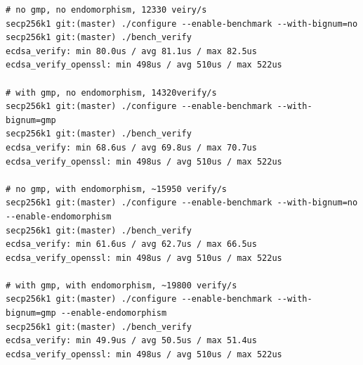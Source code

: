 \documentclass{article}
\newcommand{\code}[1]{\lstinline!#1!}
\begin{document}
\begin{lstlisting}[caption=\texttt{ECDSA with secp256k1 benchmark, OpenSSL vs libsecp256k1 }, label=lst-openssl-libsecp256k1-bench]
# no gmp, no endomorphism, 12330 veiry/s
secp256k1 git:(master) ./configure --enable-benchmark --with-bignum=no
secp256k1 git:(master) ./bench_verify
ecdsa_verify: min 80.0us / avg 81.1us / max 82.5us
ecdsa_verify_openssl: min 498us / avg 510us / max 522us

# with gmp, no endomorphism, 14320verify/s
secp256k1 git:(master) ./configure --enable-benchmark --with-bignum=gmp
secp256k1 git:(master) ./bench_verify
ecdsa_verify: min 68.6us / avg 69.8us / max 70.7us
ecdsa_verify_openssl: min 498us / avg 510us / max 522us

# no gmp, with endomorphism, ~15950 verify/s
secp256k1 git:(master) ./configure --enable-benchmark --with-bignum=no --enable-endomorphism
secp256k1 git:(master) ./bench_verify
ecdsa_verify: min 61.6us / avg 62.7us / max 66.5us
ecdsa_verify_openssl: min 498us / avg 510us / max 522us

# with gmp, with endomorphism, ~19800 verify/s
secp256k1 git:(master) ./configure --enable-benchmark --with-bignum=gmp --enable-endomorphism
secp256k1 git:(master) ./bench_verify
ecdsa_verify: min 49.9us / avg 50.5us / max 51.4us
ecdsa_verify_openssl: min 498us / avg 510us / max 522us
\end{lstlisting}



\end{document}
